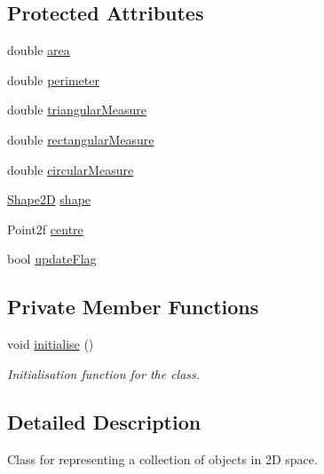 \subsection*{Protected Attributes}
\begin{DoxyCompactItemize}
\item 
double \hyperlink{classmultiscale_1_1analysis_1_1SpatialCollection2D_ac570cc755e52aeb9deacf12d223a4a3a}{area}
\item 
double \hyperlink{classmultiscale_1_1analysis_1_1SpatialCollection2D_ae8045702b66fd813cfff49fa86b02e68}{perimeter}
\item 
double \hyperlink{classmultiscale_1_1analysis_1_1SpatialCollection2D_a578070e91858e9e87de1e0f5771d6c3f}{triangular\-Measure}
\item 
double \hyperlink{classmultiscale_1_1analysis_1_1SpatialCollection2D_aad7d79a7bd299d4d3c08a864cfcb77c3}{rectangular\-Measure}
\item 
double \hyperlink{classmultiscale_1_1analysis_1_1SpatialCollection2D_a4c58c82dd3d67d670b554bfaeb2b19ba}{circular\-Measure}
\item 
\hyperlink{namespacemultiscale_1_1analysis_ad1ef6155ab2e954c1c33d3e2e6b53fbf}{Shape2\-D} \hyperlink{classmultiscale_1_1analysis_1_1SpatialCollection2D_a4df95ecca90ce33332a69e0aefcf73d9}{shape}
\item 
Point2f \hyperlink{classmultiscale_1_1analysis_1_1SpatialCollection2D_afe9ef6b70ff53161cb02749444ae372c}{centre}
\item 
bool \hyperlink{classmultiscale_1_1analysis_1_1SpatialCollection2D_a6d942f2856adc673e9d361596744b37f}{update\-Flag}
\end{DoxyCompactItemize}
\subsection*{Private Member Functions}
\begin{DoxyCompactItemize}
\item 
void \hyperlink{classmultiscale_1_1analysis_1_1SpatialCollection2D_ae128b71f769a10ff5bc7452e2ec9d555}{initialise} ()
\begin{DoxyCompactList}\small\item\em Initialisation function for the class. \end{DoxyCompactList}\end{DoxyCompactItemize}


\subsection{Detailed Description}
Class for representing a collection of objects in 2\-D space. 

